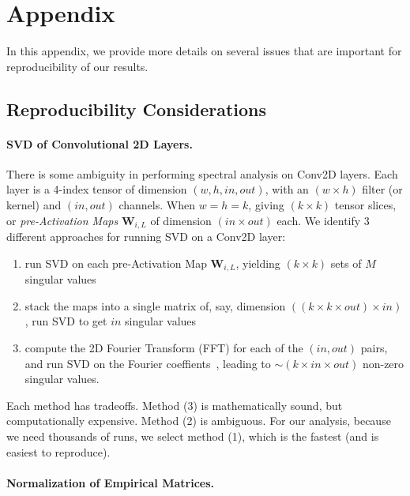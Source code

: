 \section{Appendix}
\label{sxn:appendix}


In this appendix, we provide more details on several issues that are important for reproducibility of our results.


\subsection{Reproducibility Considerations}


\paragraph{SVD of Convolutional 2D Layers.}

There is some ambiguity in performing spectral analysis on Conv2D layers.  
Each layer is a 4-index tensor of dimension $(w,h,in,out)$, with an $(w\times h)$ filter (or kernel) and $(in, out)$
channels. When $w=h=k$,  giving $(k\times k)$ tensor slices, or \emph{pre-Activation Maps} $\mathbf{W}_{i,L}$ of dimension $(in\times out)$ each. 
%
We identify 3 different approaches for running SVD on a Conv2D layer:
\begin{enumerate}
\item run SVD on each pre-Activation Map $\mathbf{W}_{i,L}$, yielding $(k\times k)$ sets of $M$ singular values
\item stack the maps into a single matrix of, say, dimension $((k\times k\times out)\times in)$, run SVD to get $in$ singular values
\item compute the 2D Fourier Transform (FFT) for each of the $(in, out)$ pairs, and run SVD on the Fourier coeffients~\cite{CNNSVD}, leading to $\sim(k\times in\times out)$ non-zero singular values.
\end{enumerate}
Each method has tradeoffs.  
Method (3) is mathematically sound, but computationally expensive. Method (2) is ambiguous.
For our analysis, because we need thousands of runs, we select method (1), which is the fastest (and is easiest to reproduce).


\paragraph{Normalization of Empirical Matrices.}  

